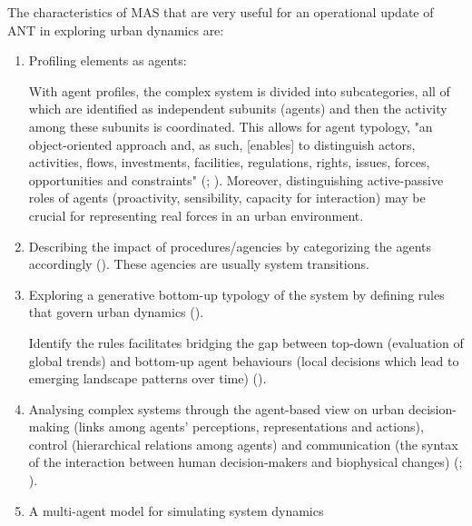 \documentclass[11pt]{report}
\begin{document}
{{{{The characteristics of MAS that are very useful for an operational update of ANT in exploring urban dynamics are:

\begin{enumerate}
\item Profiling elements as agents: 

With agent profiles, the complex system is divided into subcategories, all of which are identified as independent subunits (agents) and then the activity among these subunits is coordinated. This allows for agent typology, "an object-oriented approach and, as such, [enables] to distinguish actors, activities, flows, investments, facilities, regulations, rights, issues, forces, opportunities and constraints" (\href{Hopkins}{\citealt{hopkins_structure_1999}}; \href{Saarloos}{\citealt{saarloos_multi-agent_2008}}). 
Moreover, distinguishing active-passive roles of agents (proactivity, sensibility, capacity for interaction) may be crucial for representing real forces in an urban environment.
 
\item Describing the impact of procedures/agencies by categorizing the agents accordingly (\href{Arsanjani}{\citealt{arsanjani_spatiotemporal_2013}}). These agencies are usually system transitions.

\item Exploring a generative bottom-up typology of the system by defining rules that govern urban dynamics (\href{Bretagnolle}{\citealt{bretagnolle_simulating_2010}}).

Identify the rules facilitates bridging the gap between top-down (evaluation of global trends) and bottom-up agent behaviours (local decisions which lead to emerging landscape patterns over time) (\href{Bone}{\citealt{bone_modeling---middle:_2011}}). 

\item Analysing complex systems through the agent-based view on urban decision-making (links among agents' perceptions, representations and actions), control (hierarchical relations among agents) and communication (the syntax of the interaction between human decision-makers and biophysical changes) (\href{Bousquet}{\citealt{bousquet_multi-agent_2004}}; \href{Brown}{\citealt{brown_exurbia_2008}}).

\item A multi-agent model for simulating system dynamics


\end{enumerate}}}}}
\end{document}
